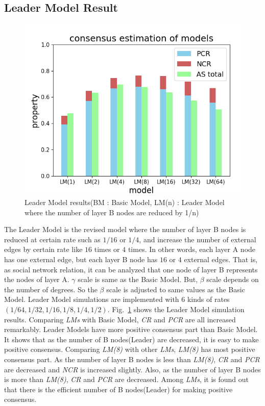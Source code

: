 \documentclass[english]{cccconf}
\begin{document}
\subsection{Leader Model Result}
\begin{figure}[!htb]
  \centering
  \includegraphics[width=\hsize]{FIG5.png}
  \caption{Leader Model results(BM : Basic Model, LM(n) : Leader Model where the number of layer B nodes are reduced by 1/n)}
  \label{Fig5}
\end{figure}
The Leader Model is the revised model where the number of layer B nodes is reduced at certain rate such as $1/16$ or $1/4$, and increase the number of external edges by certain rate like $16$ times or $4$ times. In other words, each layer A node has one external edge, but each layer B node has $16$ or $4$ external edges. That is, as social network relation, it can be analyzed that one node of layer B represents the nodes of layer A. $\gamma$ scale is same as the Basic Model. But, $\beta$ scale depends on the number of degrees. So the $\beta$ scale is adjusted to same values as the Basic Model. Leader Model simulations are implemented with $6$ kinds of rates$(1/64, 1/32, 1/16, 1/8, 1/4, 1/2)$. Fig.~\ref{Fig5} shows the Leader Model simulation results. Comparing \textit{LMs} with Basic Model, \textit{CR} and \textit{PCR} are all increased remarkably. Leader Models have more positive consensus part than Basic Model. It shows that as the number of B nodes(Leader) are decreased, it is easy to make positive consensus. Comparing \textit{LM(8)} with other \textit{LMs}, \textit{LM(8)} has most positive consensus part. As the number of layer B nodes is less than \textit{LM(8)},  \textit{CR} and \textit{PCR} are decreased and \textit{NCR} is increased slightly. Also, as the number of layer B nodes is more than \textit{LM(8)}, \textit{CR} and \textit{PCR} are decreased. Among \textit{LMs}, it is found out that there is the efficient number of B nodes(Leader) for making positive consensus.   
\end{document}
